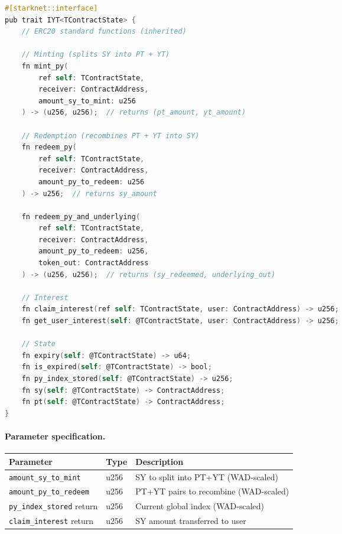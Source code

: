 \begin{lstlisting}[language=C,basicstyle=\ttfamily\small,frame=single,breaklines=true,columns=fullflexible]
#[starknet::interface]
pub trait IYT<TContractState> {
    // ERC20 standard functions (inherited)

    // Minting (splits SY into PT + YT)
    fn mint_py(
        ref self: TContractState,
        receiver: ContractAddress,
        amount_sy_to_mint: u256
    ) -> (u256, u256);  // returns (pt_amount, yt_amount)

    // Redemption (recombines PT + YT into SY)
    fn redeem_py(
        ref self: TContractState,
        receiver: ContractAddress,
        amount_py_to_redeem: u256
    ) -> u256;  // returns sy_amount

    fn redeem_py_and_underlying(
        ref self: TContractState,
        receiver: ContractAddress,
        amount_py_to_redeem: u256,
        token_out: ContractAddress
    ) -> (u256, u256);  // returns (sy_redeemed, underlying_out)

    // Interest
    fn claim_interest(ref self: TContractState, user: ContractAddress) -> u256;
    fn get_user_interest(self: @TContractState, user: ContractAddress) -> u256;

    // State
    fn expiry(self: @TContractState) -> u64;
    fn is_expired(self: @TContractState) -> bool;
    fn py_index_stored(self: @TContractState) -> u256;
    fn sy(self: @TContractState) -> ContractAddress;
    fn pt(self: @TContractState) -> ContractAddress;
}
\end{lstlisting}

\paragraph{Parameter specification.}
\begin{center}
\begin{tabular}{l l l}
\toprule
\textbf{Parameter} & \textbf{Type} & \textbf{Description} \\
\midrule
\texttt{amount\_sy\_to\_mint} & u256 & SY to split into PT+YT (WAD-scaled) \\
\texttt{amount\_py\_to\_redeem} & u256 & PT+YT pairs to recombine (WAD-scaled) \\
\texttt{py\_index\_stored} return & u256 & Current global index (WAD-scaled) \\
\texttt{claim\_interest} return & u256 & SY amount transferred to user \\
\bottomrule
\end{tabular}
\end{center}

